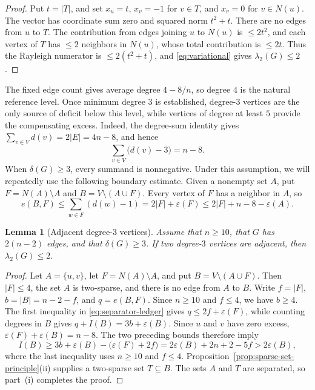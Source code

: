 \documentclass[11pt]{article}
\numberwithin{equation}{section}
\newtheorem{lemma}[theorem]{Lemma}
\theoremstyle{definition}
\theoremstyle{remark}
\newcommand{\ac}{\lambda_2}
\begin{document}
\begin{proof}
Put \(t=|T|\), and set \(x_u=t\), \(x_v=-1\) for \(v\in T\), and
\(x_v=0\) for \(v\in N(u)\).  The vector has coordinate sum zero and
squared norm \(t^2+t\).  There are no edges from \(u\) to \(T\).  The
contribution from edges joining \(u\) to \(N(u)\) is \(\le2t^2\), and each
vertex of \(T\) has \(\le2\) neighbors in \(N(u)\), whose total contribution
is \(\le2t\).  Thus the Rayleigh numerator is \(\le2(t^2+t)\), and
\eqref{eq:variational} gives \(\ac(G)\le2\).
\end{proof}

The fixed edge count gives average degree \(4-8/n\), so degree \(4\) is
the natural reference level.  Once minimum degree \(3\) is established,
degree-\(3\) vertices are the only source of deficit below this level,
while vertices of degree at least \(5\) provide the compensating excess.
Indeed, the degree-sum identity gives
\(\sum_{v\in V}d(v)=2|E|=4n-8\), and hence
\begin{equation}\label{eq:total-excess}
  \sum_{v\in V}\bigl(d(v)-3\bigr)=n-8.
\end{equation}
When \(\delta(G)\ge3\), every summand is nonnegative.  Under this assumption,
we will repeatedly use the following boundary estimate.  Given a nonempty
set \(A\), put \(F=N(A)\setminus A\) and
\(B=V\setminus(A\cup F)\).  Every vertex of \(F\) has a neighbor in \(A\), so
\begin{equation}\label{eq:separator-ledger}
  e(B,F)
  \le \sum_{w\in F}(d(w)-1)
  =2|F|+\varepsilon(F)
  \le2|F|+n-8-\varepsilon(A).
\end{equation}

\begin{lemma}[Adjacent degree-\(3\) vertices]\label{lem:adjacent-three}
Assume that \(n\ge10\), that \(G\) has \(2(n-2)\) edges, and that
\(\delta(G)\ge3\).  If two degree-\(3\) vertices are adjacent, then
\(\ac(G)\le2\).
\end{lemma}

\begin{proof}
Let \(A=\{u,v\}\), let \(F=N(A)\setminus A\), and put
\(B=V\setminus(A\cup F)\).  Then \(|F|\le4\), the set \(A\) is
two-sparse, and there is no edge from \(A\) to \(B\).  Write \(f=|F|\),
\(b=|B|=n-2-f\), and \(q=e(B,F)\).  Since \(n\ge10\) and \(f\le4\), we
have \(b\ge4\).  The first inequality in \eqref{eq:separator-ledger} gives
\(q\le2f+\varepsilon(F)\), while counting degrees in \(B\) gives
\(q+I(B)=3b+\varepsilon(B)\).
Since \(u\) and \(v\) have zero excess,
\(\varepsilon(F)+\varepsilon(B)=n-8\).  The two preceding bounds therefore
imply
\[
 I(B)\ge3b+\varepsilon(B)-\bigl(\varepsilon(F)+2f\bigr)
       =2\varepsilon(B)+2n+2-5f>2\varepsilon(B),
\]
where the last inequality uses \(n\ge10\) and \(f\le4\).
Proposition~\ref{prop:sparse-set-principle}(ii) supplies a two-sparse set
\(T\subseteq B\).  The sets \(A\) and \(T\) are separated, so part~(i)
completes the proof.
\end{proof}
\end{document}
